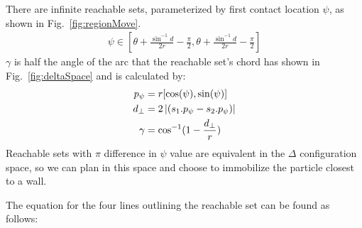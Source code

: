 There are infinite reachable sets, parameterized by first contact location $\psi$, as shown in Fig.~\ref{fig:regionMove}.
\begin{align}
 \psi \in [\theta +\frac{\sin^{-1}{d}}{2r} - \frac{\pi}{2}, \theta +\frac{\sin^{-1}{d}}{2r} - \frac{\pi}{2}]
\end{align}
$\gamma$ is half the angle of the arc that the reachable set's chord has shown in Fig.~\ref{fig:deltaSpace} and is calculated by:
\begin{align}
p_\psi &= r[\cos(\psi ), \sin(\psi )]\\
d_\perp&= 2 \left\lvert(s_1.p_\psi - s_2.p_\psi)\right\rvert\\
\gamma &= \cos^{-1} (1-\frac{d_\perp}{r} )
\end{align}
Reachable sets with $\pi$ difference in $\psi$ value are equivalent in the  $\Delta$ configuration space, so we can plan in this space and choose to immobilize the particle closest to a wall. 

The equation for the four lines outlining the reachable set can be found as follows:
   

